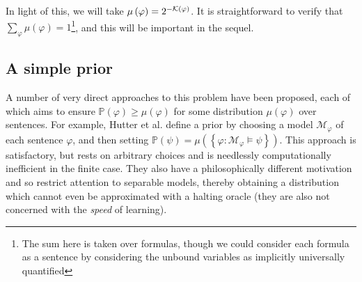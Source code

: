 \documentclass[12pt]{article}
\theoremstyle{definition}
\newcommand{\of}[1]{\left(#1\right)}
\renewcommand{\b}[1]{\left\{#1\right\}}
\newcommand{\M}{\mathcal{M}}
\newcommand{\muv}{\mu\of{\vp}}
\renewcommand{\P}[1]{\mathbb{P}\of{#1}}
\newcommand{\vp}{\varphi}
\begin{document}
%
%
%
%
%
%
In light of this, we will take $\mu\of{\vp} = 2^{-\k{\vp}}$.
It is straightforward to verify that $\sum_{\vp} \muv = 1$\footnote{The sum
here is taken over formulas, though we could consider each formula as a sentence
by considering the unbound variables as implicitly universally quantified},
and this will be important in the sequel.


\subsection{A simple prior}

A number of very direct approaches to this problem have been proposed,
each of which aims to ensure $\P{\vp} \geq \mu\of{\vp}$ for some distribution $\muv$
over sentences.
For example, Hutter et al. define a prior by choosing a model $\M_{\vp}$ of each sentence $\vp$,
and then setting $\P{\psi} = \mu\of{\b{\vp : \M_{\vp} \models \psi}}$.
This approach is satisfactory, but rests on arbitrary choices
and is needlessly computationally inefficient in the finite case.
They also have a philosophically different motivation and so restrict attention to separable models,
thereby obtaining a distribution which cannot even be approximated
with a halting oracle (they are also not concerned with the \emph{speed} of learning).
\end{document}
